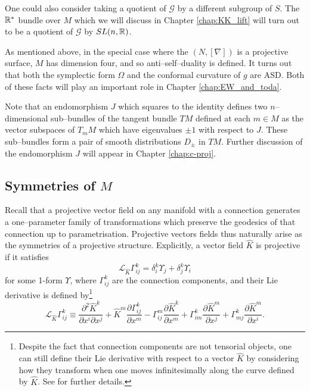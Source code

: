 \begin{rmk}
One could also consider taking a quotient of $\mathcal{G}$ by a different subgroup of $S$. The $\mathbb{R}^*$ bundle over $M$ which we will discuss in Chapter \ref{chap:KK_lift} will turn out to be a quotient of $\mathcal{G}$ by $SL(n,\mathbb{R})$.
\end{rmk}

\begin{rmk}
As mentioned above, in the special case where the $(N,[\nabla])$ is a projective surface, $M$ has dimension four, and so anti--self--duality is defined. It turns out that both the symplectic form $\Omega$ and the conformal curvature of $g$ are ASD. Both of these facts will play an important role in Chapter \ref{chap:EW_and_toda}.
\end{rmk}

\begin{rmk}
Note that an endomorphism $J$ which squares to the identity defines two $n$--dimensional sub--bundles of the tangent bundle $TM$ defined at each $m\in M$ as the vector subspaces of $T_mM$ which have eigenvalues $\pm 1$ with respect to $J$. These sub--bundles form a pair of smooth distributions $D_\pm$ in $TM$. Further discussion of the endomorphism $J$ will appear in Chapter \ref{chap:c-proj}.
\end{rmk}

\subsection{Symmetries of $M$}

Recall that a projective vector field on any manifold with a connection
generates a one--parameter family of transformations which preserve the
geodesics of that connection up to parametrisation. Projective vectors
fields thus naturally arise as the symmetries of a projective structure.
Explicitly, a vector field $\widehat{K}$ is projective if it satisfies
\begin{equation}
\mathcal{L}_{\widehat{K}}\Gamma_{ij}^{k}=\delta_{i}^{k}\Upsilon_{j}+\delta_{j}^{k}\Upsilon_{i}\label{eq:proj_transf}
\end{equation}
for some 1-form $\Upsilon$, where $\Gamma_{ij}^{k}$ are the connection
components, and their Lie derivative is defined by\footnote{Despite the fact that connection components are not tensorial objects, one can still define their Lie derivative with respect to a vector $\widehat{K}$ by considering how they transform when one moves infinitesimally along the curve defined by $\widehat{K}$. See \cite{yano} for further details.}
\begin{equation}
\mathcal{L}_{\widehat{K}}\Gamma_{ij}^{k}\equiv\frac{\partial^{2}\widehat{K}^{k}}{\partial x^{i}\partial x^{j}}+\widehat{K}^{m}\frac{\partial\Gamma_{ij}^{k}}{\partial x^{m}}-\Gamma_{ij}^{m}\frac{\partial \widehat{K}^{k}}{\partial x^{m}}+\Gamma_{im}^{k}\frac{\partial \widehat{K}^{m}}{\partial x^{j}}+\Gamma_{mj}^{k}\frac{\partial \widehat{K}^{m}}{\partial x^{i}}.\label{eq:liederivGamma}
\end{equation}


